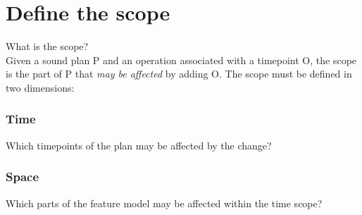 
\section{Define the scope}
\label{sec:define-the-scope}
What is the scope?
\\

Given a sound plan P and an operation associated with a timepoint O, the scope is the part of P that \textit{may be affected} by adding O. The scope must be defined in two dimensions:\\

\subsubsection*{Time}
Which timepoints of the plan may be affected by the change?

\subsubsection*{Space}
Which parts of the feature model may be affected within the time scope?

